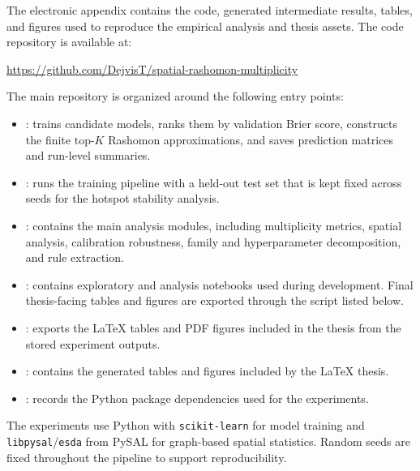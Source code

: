 \documentclass[12pt]{article}
\begin{document}
The electronic appendix contains the code, generated intermediate results, tables, and
figures used to reproduce the empirical analysis and thesis assets. The code repository is
available at:

\begin{center}
\url{https://github.com/DejvisT/spatial-rashomon-multiplicity}
\end{center}

The main repository is organized around the following entry points:

\begin{itemize}
    \item {}: trains candidate models, ranks them by
    validation Brier score, constructs the finite top-$K$ Rashomon approximations, and
    saves prediction matrices and run-level summaries.

    \item {}: runs the training pipeline with a held-out test set that is kept fixed across seeds for the hotspot stability analysis.

    \item {}: contains the main analysis modules, including multiplicity
    metrics, spatial analysis, calibration robustness, family and hyperparameter
    decomposition, and rule extraction.

    \item {}: contains exploratory and analysis notebooks used during
    development. Final thesis-facing tables and figures are exported through the script
    listed below.

    \item {}: exports the LaTeX tables and PDF
    figures included in the thesis from the stored experiment outputs.

    \item {}: contains the generated tables
    and figures included by the LaTeX thesis.

    \item {}: records the Python package dependencies used for the
    experiments.
\end{itemize}

The experiments use Python with \texttt{scikit-learn} for model training and
\texttt{libpysal}/\texttt{esda} from PySAL for graph-based spatial statistics. Random seeds
are fixed throughout the pipeline to support reproducibility.
\end{document}
